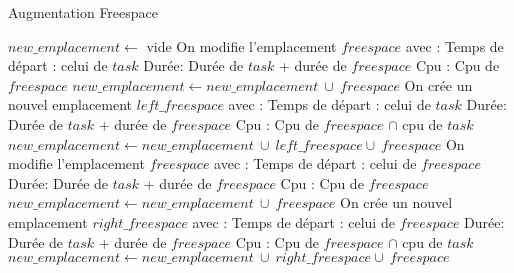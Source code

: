 \documentclass{report}
\begin{document}
\begin{algorithm}
\caption{Augmentation Freespace}\label{extend_freespace}
\begin{algorithmic}[1]
	\State $new\_emplacement \gets$ vide
	\State
			\State On modifie l'emplacement $freespace$ avec :
			\State \hspace{\algorithmicindent} Temps de départ : celui de $task$
			\State \hspace{\algorithmicindent} Durée: Durée de $task$ + durée de $freespace$
			\State \hspace{\algorithmicindent} Cpu : Cpu de $freespace$
		\State $new\_emplacement \gets new\_emplacement\ \cup\ freespace$  
		\Else
			\State On crée un nouvel emplacement $left\_freespace$ avec :
			\State \hspace{\algorithmicindent} Temps de départ : celui de $task$
			\State \hspace{\algorithmicindent} Durée: Durée de $task$ + durée de $freespace$
			\State \hspace{\algorithmicindent} Cpu : Cpu de $freespace$ $\cap$ cpu de $task$
		\State $new\_emplacement \gets new\_emplacement\ \cup\ left\_freespace \cup\ freespace$
		\EndIf
			\State On modifie l'emplacement $freespace$ avec :
			\State \hspace{\algorithmicindent} Temps de départ : celui de $freespace$
			\State \hspace{\algorithmicindent} Durée: Durée de $task$ + durée de $freespace$
			\State \hspace{\algorithmicindent} Cpu : Cpu de $freespace$
		\State $new\_emplacement \gets new\_emplacement\ \cup\ freespace$  
		\Else
			\State On crée un nouvel emplacement $right\_freespace$ avec :
			\State \hspace{\algorithmicindent} Temps de départ : celui de $freespace$
			\State \hspace{\algorithmicindent} Durée: Durée de $task$ + durée de $freespace$
			\State \hspace{\algorithmicindent} Cpu : Cpu de $freespace$ $\cap$ cpu de $task$
		\State $new\_emplacement \gets new\_emplacement\ \cup\ right\_freespace \cup\ freespace$
		\EndIf
{}
\end{algorithmic}
\end{algorithm}
\end{document}
